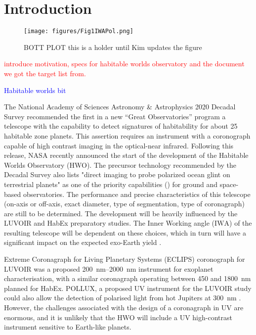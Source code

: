 \documentclass[
    usenatbib,
]{mnras}
\newcommand{\IWA}{\ensuremath{\mathrm{IWA}}}
\begin{document}
\section{Introduction}
\label{sec:intro}

\begin{figure*}%
   \centering
   \texttt{[image: figures/Fig1IWAPol.png]}
   \caption{BOTT PLOT this is a holder until Kim updates the figure}
    \label{fig:bottplot}
\end{figure*}

\textcolor{red}{introduce motivation, specs for habitable worlds observatory and the document we got the target list from.}

\textcolor{blue}{Habitable worlds bit}

The National Academy of Sciences Astronomy \& Astrophysics 2020 Decadal Survey \citep{decadal} recommended the first in a new \enquote{Great Observatories} program a telescope with the capability to detect signatures of habitability for about 25 habitable zone planets. This assertion requires an instrument with a coronograph capable of high contrast imaging in the optical-near infrared. Following this release, NASA recently announced the start of the development of the Habitable Worlds Observatory (HWO). The precursor technology recommended by the Decadal Survey also lists "direct imaging to probe polarized ocean glint on terrestrial planets" as one of the priority capabilities (\citet[Box E.1 in][]{decadal}) for ground and space-based observatories.
The performance and precise characteristics of this telescope (on-axis or off-axis, exact diameter, type of segmentation, type of coronagraph) are still to be determined. The development will be heavily influenced by the LUVOIR \citep{LUVOIR2019} and HabEx \citep{HabEx_2020} preparatory studies.  The Inner Working angle (\IWA) of the resulting telescope will be dependent on these choices, which in turn will have a significant impact on the expected exo-Earth yield \cite{Stark2019_exoplanetyield}.


Extreme Coronagraph for Living Planetary Systems (ECLIPS) coronograph for LUVOIR was a proposed \SIrange{200}{2000}{\nano\meter} instrument for exoplanet characterisation, with a similar coronagraph operating between \num{450} and \SI{1800}{\nano\meter} planned for HabEx. 
POLLUX, a proposed UV instrument for the LUVOIR study could also allow the detection of polarised light from hot Jupiters at \SI{300}{\nano\meter} \citep{Bouret2018_pollux}.  However, the challenges associated with the design of a coronagraph in UV are enormous, and it is unlikely that the HWO will include a UV high-contrast instrument sensitive to Earth-like planets.
\end{document}
